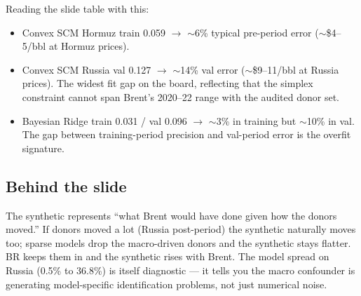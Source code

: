 \documentclass[11pt,a4paper]{article}
\begin{document}
Reading the slide table with this:
\begin{itemize}\setlength\itemsep{0.05em}
  \item Convex SCM Hormuz train 0.059 $\to$ $\sim$6\% typical pre-period error ($\sim$\$4--5/bbl at Hormuz prices).
  \item Convex SCM Russia val 0.127 $\to$ $\sim$14\% val error ($\sim$\$9--11/bbl at Russia prices). The widest fit gap on the board, reflecting that the simplex constraint cannot span Brent's 2020--22 range with the audited donor set.
  \item Bayesian Ridge train 0.031 / val 0.096 $\to$ $\sim$3\% in training but $\sim$10\% in val. The gap between training-period precision and val-period error is the overfit signature.
\end{itemize}

\subsection{Behind the slide}
The synthetic represents ``what Brent would have done given how the donors moved.'' If donors moved a lot (Russia post-period) the synthetic naturally moves too; sparse models drop the macro-driven donors and the synthetic stays flatter. BR keeps them in and the synthetic rises with Brent. The model spread on Russia (0.5\% to 36.8\%) is itself diagnostic --- it tells you the macro confounder is generating model-specific identification problems, not just numerical noise.
\end{document}
